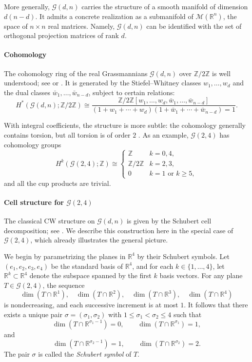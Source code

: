 \documentclass[a4paper,english,cleveref,autoref,thm-restate,nolineno]{socg-lipics-v2021}
\newcommand{\R}{\mathbb R}
\newcommand{\Z}{\mathbb Z}
\newcommand{\GG}{\mathcal G} %
\begin{document}
More generally, $\GG(d,n)$ carries the structure of a smooth manifold of dimension $d(n-d)$.
It admits a concrete realization as a submanifold of $\mathcal M(\R^n)$, the space of $n\times n$ real matrices.
Namely, $\GG(d,n)$ can be identified with the set of orthogonal projection matrices of rank $d$.

\paragraph*{Cohomology}

The cohomology ring of the real Grassmannians $\GG(d,n)$ over $\Z/2\Z$ is well understood; see \cite[Problem 7-B, p.~95]{Milnor_1974} or \cite[p.~190]{Borel1953}.
It is generated by the Stiefel--Whitney classes $w_1,\dots,w_d$ and the dual classes $\bar w_1,\dots,\bar w_{n-d}$, subject to certain relations: 
\[
H^*(\GG(d,n);\Z/2\Z)
\cong
\frac{\Z/2\Z[w_1,\dots,w_d,\bar w_1,\dots,\bar w_{n-d}]}
{(1+w_1+\cdots+w_d)(1+\bar w_1+\cdots+\bar w_{n-d})=1}.
\]

With integral coefficients, the structure is more subtle: the cohomology generally contains torsion, but all torsion is of order $2$ \cite{JMPA_1937_9_16_1-4_69_0,hiller1980cohomology}.
As an example, $\GG(2,4)$ has cohomology groups
\[
H^k(\GG(2,4);\Z)\cong
\begin{cases}
	\Z & k=0,4,\\
	\Z/2\Z & k=2,3,\\
	0 & k=1 \text{ or } k\ge 5,
\end{cases}
\]
and all the cup products are trivial.

\paragraph*{Cell structure for $\GG(2,4)$}

The classical CW structure on $\GG(d,n)$ is given by the Schubert cell decomposition; see \cite[Section~6]{Milnor_1974}.
We describe this construction here in the special case of $\GG(2,4)$, which already illustrates the general picture.

We begin by parametrizing the planes in $\R^4$ by their Schubert symbols.
Let $(e_1,e_2,e_3,e_4)$ be the standard basis of $\R^4$, and for each $k\in\{1,\dots,4\}$, let $\R^k\subset \R^4$ denote the subspace spanned by the first $k$ basis vectors.
For any plane $T\in \GG(2,4)$, the sequence
\[
\dim(T\cap \R^1),\quad \dim(T\cap \R^2),\quad \dim(T\cap \R^3),\quad \dim(T\cap \R^4)
\]
is nondecreasing, and each successive increment is at most $1$.
It follows that there exists a unique pair $\sigma=(\sigma_1,\sigma_2)$ with
$1\le \sigma_1 < \sigma_2 \le 4$ such that
\[
\dim(T\cap \R^{\sigma_1-1})=0,\qquad \dim(T\cap \R^{\sigma_1})=1,
\]
and
\[
\dim(T\cap \R^{\sigma_2-1})=1,\qquad \dim(T\cap \R^{\sigma_2})=2.
\]
The pair $\sigma$ is called the \emph{Schubert symbol} of $T$.
\end{document}
